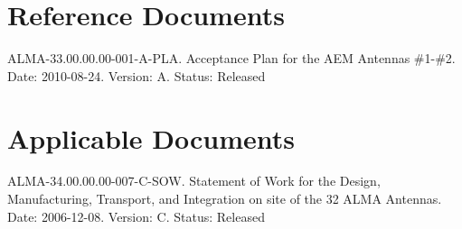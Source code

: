 \clearpage
{}
\nocite{*}
\begin{thebibliography}{9}
\thispagestyle{fancy}
\section{Reference Documents}
 ALMA-33.00.00.00-001-A-PLA. Acceptance Plan for the \acs{AEM} Antennas \#1-\#2. Date: 2010-08-24. Version: A. Status: Released


\section{Applicable Documents}
 ALMA-34.00.00.00-007-C-SOW. Statement of Work for the Design, Manufacturing, Transport, and Integration on site of the 32 ALMA Antennas. Date: 2006-12-08. Version: C. Status: Released
\end{thebibliography}
